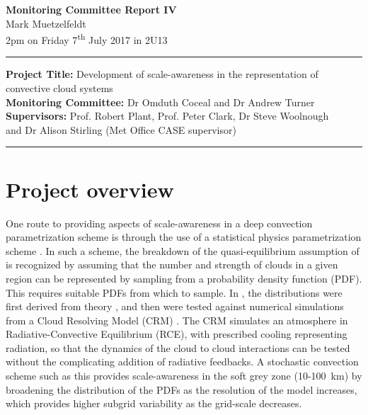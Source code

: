 \documentclass[11pt,a4paper]{article}
\newcommand{\ts}{\textsuperscript}
\begin{document}

\begin{center}
    \Large{\textbf{Monitoring Committee Report IV}}\\[0.1cm]
    \large{Mark Muetzelfeldt}\\
    \normalsize{2pm on Friday 7\ts{th} July 2017 in 2U13}\\[0.1cm]		
    \rule{\textwidth}{0.2mm}
    \textbf{Project Title: }Development of scale-awareness in the representation of
    convective cloud systems\\
    \textbf{Monitoring Committee: }Dr Omduth Coceal and  Dr Andrew Turner\\
    \textbf{Supervisors: }Prof. Robert Plant, Prof. Peter Clark, Dr Steve Woolnough \\
    and Dr Alison Stirling (Met Office CASE supervisor)\\
    \rule{\textwidth}{0.2mm}
\end{center}

\section{Project overview}
\label{sec:Project Overview}

One route to providing aspects of scale-awareness in a deep convection parametrization scheme is through the use of a statistical physics parametrization scheme \parencite{plant2008stochastic}. In such a scheme, the breakdown of the quasi-equilibrium assumption of \cite{arakawa1974interaction} is recognized by assuming that the number and strength of clouds in a given region can be represented by sampling from a probability density function (PDF). This requires suitable PDFs from which to sample. In \cite{plant2008stochastic}, the distributions were first derived from theory \parencite{craig2006fluctuations}, and then were tested against numerical simulations from a Cloud Resolving Model (CRM) \parencite{cohen2006fluctuations}. The CRM simulates an atmosphere in Radiative-Convective Equilibrium (RCE), with prescribed cooling representing radiation, so that the dynamics of the cloud to cloud interactions can be tested without the complicating addition of radiative feedbacks. A stochastic convection scheme such as this provides scale-awareness in the soft grey zone (\SI{10}{}-\SI{100}{km}) by broadening the distribution of the PDFs as the resolution of the model increases, which provides higher subgrid variability as the grid-scale decreases.
\end{document}
